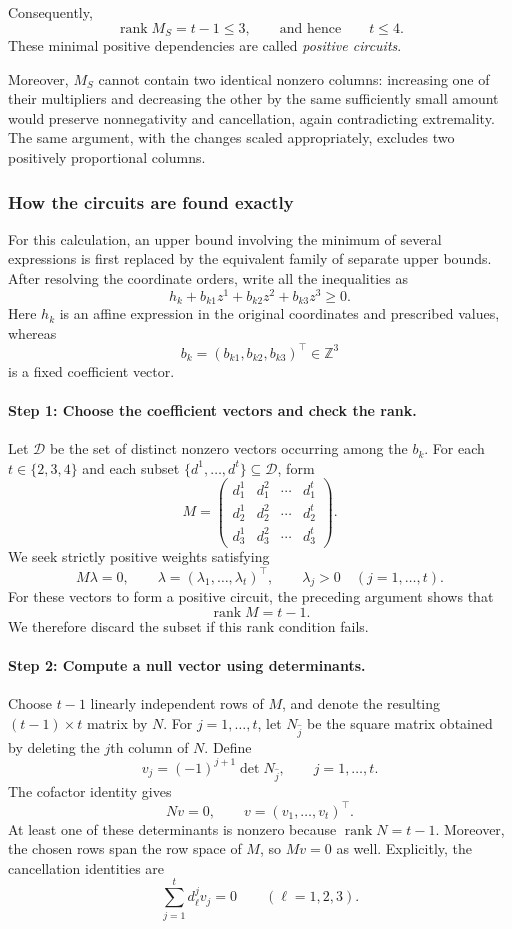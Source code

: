 \documentclass[a4paper,11pt]{amsart}
\numberwithin{equation}{section}
\theoremstyle{definition}
\theoremstyle{remark}
\begin{document}
Consequently,
\[
 \operatorname{rank}M_S=t-1\le3,
 \qquad\text{and hence}\qquad t\le4.
\]
These minimal positive dependencies are called \emph{positive circuits}.

Moreover, $M_S$ cannot contain two identical nonzero columns:
increasing one of their multipliers and decreasing the other by the
same sufficiently small amount would preserve nonnegativity and
cancellation, again contradicting extremality.
The same argument, with the changes scaled appropriately, excludes
two positively proportional columns.


\subsubsection{How the circuits are found exactly}

For this calculation, an upper bound involving the minimum of several
expressions is first replaced by the equivalent family of separate
upper bounds. After resolving the coordinate orders, write all the
inequalities as
\[
 h_k+b_{k1}z^1+b_{k2}z^2+b_{k3}z^3\ge0.
\]
Here $h_k$ is an affine expression in the original coordinates and
prescribed values, whereas
\[
 b_k=(b_{k1},b_{k2},b_{k3})^\top\in\mathbb Z^3
\]
is a fixed coefficient vector.

\paragraph{Step 1: Choose the coefficient vectors and check the rank.}
Let $\mathcal D$ be the set of distinct nonzero vectors occurring among
the $b_k$. For each $t\in\{2,3,4\}$ and each subset
$\{d^1,\ldots,d^t\}\subseteq\mathcal D$, form
\[
 M=
 \begin{pmatrix}
 d^1_1&d^2_1&\cdots&d^t_1\\
 d^1_2&d^2_2&\cdots&d^t_2\\
 d^1_3&d^2_3&\cdots&d^t_3
 \end{pmatrix}.
\]
We seek strictly positive weights satisfying
\[
 M\lambda=0,
 \qquad
 \lambda=(\lambda_1,\ldots,\lambda_t)^\top,
 \qquad
 \lambda_j>0\quad(j=1,\ldots,t).
\]
For these vectors to form a positive circuit, the preceding argument
shows that
\[
 \operatorname{rank}M=t-1.
\]
We therefore discard the subset if this rank condition fails.

\paragraph{Step 2: Compute a null vector using determinants.}
Choose $t-1$ linearly independent rows of $M$, and denote the resulting
$(t-1)\times t$ matrix by $N$.
For $j=1,\ldots,t$, let $N_{\widehat j}$ be the square matrix obtained
by deleting the $j$th column of $N$. Define
\[
 v_j=(-1)^{j+1}\det N_{\widehat j},
 \qquad j=1,\ldots,t.
\]
The cofactor identity gives
\[
 Nv=0,
 \qquad v=(v_1,\ldots,v_t)^\top.
\]
At least one of these determinants is nonzero because
$\operatorname{rank}N=t-1$. Moreover, the chosen rows span the row
space of $M$, so $Mv=0$ as well. Explicitly, the cancellation
identities are
\[
 \sum_{j=1}^t d^j_\ell v_j=0
 \qquad(\ell=1,2,3).
\]
\end{document}
